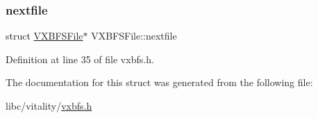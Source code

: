 \subsubsection{\texorpdfstring{nextfile}{nextfile}}
{\footnotesize\ttfamily struct \hyperlink{a00332}{V\+X\+B\+F\+S\+File}$\ast$ V\+X\+B\+F\+S\+File\+::nextfile}



Definition at line 35 of file vxbfs.\+h.



The documentation for this struct was generated from the following file\+:\begin{DoxyCompactItemize}
\item 
libc/vitality/\hyperlink{a00206}{vxbfs.\+h}\end{DoxyCompactItemize}
